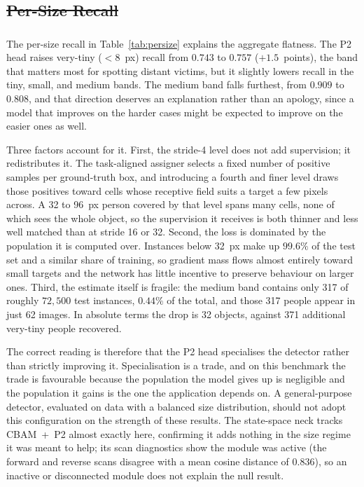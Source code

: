 \documentclass[12pt,a4paper,oneside]{report}
\providecommand{\DIFadd}[1]{{\protect\color{blue}\uwave{#1}}} %
\providecommand{\DIFdel}[1]{{\protect\color{red}\sout{#1}}}                      %
\providecommand{\DIFaddbegin}{} %
\providecommand{\DIFaddend}{} %
\providecommand{\DIFdelbegin}{} %
\providecommand{\DIFdelend}{} %
\begin{document}
\DIFdelbegin \subsection{\DIFdel{Per-Size Recall}}
\addtocounter{subsection}{-1}%
\DIFdelend \DIFaddbegin \subsubsection{\DIFadd{Per-Size Recall}}
\DIFaddend The per-size recall in Table~\ref{tab:persize} explains the aggregate
flatness. The P2 head raises very-tiny ($<8$~px) recall from $0.743$ to
$0.757$ ($+1.5$~points), the band that matters most for spotting distant
victims, but it slightly lowers recall in the tiny, small, and medium bands.
The medium band falls furthest, from $0.909$ to $0.808$, and that direction
deserves an explanation rather than an apology, since a model that improves on
the harder cases might be expected to improve on the easier ones as well.

Three factors account for it. First, the stride-4 level does not add supervision;
it redistributes it. The task-aligned assigner selects a fixed number of positive
samples per ground-truth box, and introducing a fourth and finer level draws
those positives toward cells whose receptive field suits a target a few pixels
across. A 32 to 96~px person covered by that level spans many cells, none of
which sees the whole object, so the supervision it receives is both thinner and
less well matched than at stride 16 or 32. Second, the loss is dominated by the
population it is computed over. Instances below 32~px make up $99.6\%$ of the
test set and a similar share of training, so gradient mass flows almost entirely
toward small targets and the network has little incentive to preserve behaviour
on larger ones. Third, the estimate itself is fragile: the medium band contains
only 317 of roughly $72{,}500$ test instances, $0.44\%$ of the total, and those
317 people appear in just 62 images. In absolute terms the drop is 32 objects,
against 371 additional very-tiny people recovered.

The correct reading is therefore that the P2 head specialises the detector
rather than strictly improving it. Specialisation is a trade, and on this
benchmark the trade is favourable because the population the model gives up is
negligible and the population it gains is the one the application depends on. A
general-purpose detector, evaluated on data with a balanced size distribution,
should not adopt this configuration on the strength of these results. The state-space neck tracks CBAM~+~P2 almost exactly
here, confirming it adds nothing in the size regime it was meant to help; its
scan diagnostics show the module was active (the forward and reverse scans
disagree with a mean cosine distance of $0.836$), so an inactive or disconnected
module does not explain the null result.
\end{document}
